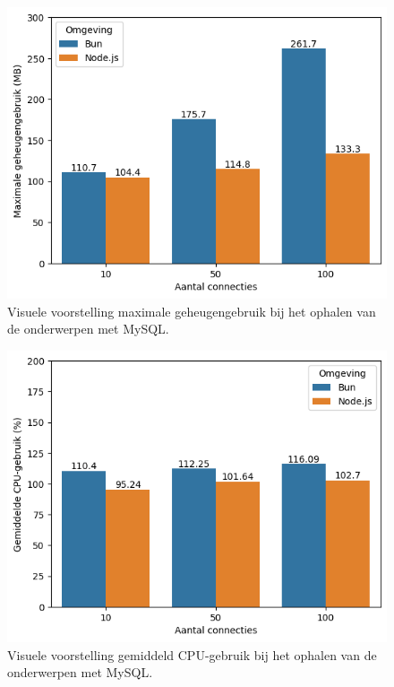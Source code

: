   \begin{figure}[H]
    \centering
    \includegraphics[width=0.7\columnwidth]{graphics/GetMySqlRAM.png}
    \caption[Geheugengebruik GET verzoek met MySQL]{\label{fig:getgeheugenmysql}Visuele voorstelling maximale geheugengebruik bij het ophalen van de onderwerpen met MySQL.}
  \end{figure}
  \begin{figure}[H]
    \centering
    \includegraphics[width=0.7\columnwidth]{graphics/GetMySqlCpu.png}
    \caption[CPU-gebruik GET verzoek met MySQL]{\label{fig:getcpumysql}Visuele voorstelling gemiddeld CPU-gebruik bij het ophalen van de onderwerpen met MySQL.}
  \end{figure}

